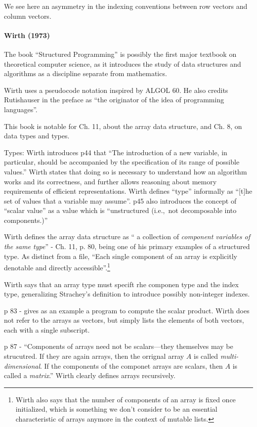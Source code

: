 We see here an asymmetry in the indexing conventions between row vectors and
column vectors.

\paragraph{Wirth (1973)~\cite{Wirth1973}}

The book ``Structured Programming'' is possibly the first major textbook on theoretical computer science, as it introduces the study of data structures and algorithms as a discipline separate from mathematics.

Wirth uses a pseudocode notation inspired by ALGOL 60. He also credits Rutishauser
in the preface as ``the originator of the idea of programming languages''.

This book is notable for Ch. 11, about the array data structure, and Ch. 8, on data types and types.

Types: Wirth introduces p44 that ``The introduction of a new variable, in particular,
should be accompanied by the specification of
its range of possible values.'' Wirth states that doing so is necessary to understand
how an algorithm works and its correctness, and further allows reasoning about memory requirements
of efficient representations.
Wirth defines ``type'' informally as ``[t]he set of values that a variable may
assume''. p45 also introduces the concept of ``scalar value'' as a value
which is ``unstructured (i.e.,\ not decomposable into components.)''


Wirth defines the array data structure as `` a collection of \textit{component
variables of the same type}'' - Ch. 11, p. 80, being one of his primary
examples of a structured type. As distinct from a file, ``Each single component
of an array is explicitly denotable and directly accessible''.\footnote{Wirth
also says that the number of
components of an array is fixed once initialized, which is something we don't
consider to be an essential characteristic of arrays anymore in the context of
mutable lists.}

Wirth says that an array type must specift rhe componen type and the index type,
generalizing Strachey's definition to introduce possibly non-integer indexes.

p 83 - gives as an example a program to compute the scalar product.
Wirth does not refer to the arrays as vectors, but simply lists the elements of
both vectors, each with a single subscript.

p 87 - ``Components of arrays need not be scalars---they themselves may be strucutred.
If they are again arrays, then the orrignal array $A$ is called \textit{multi-dimensional}.
If the components of the componet arrays are scalars, then
$A$ is called a \textit{matrix}.'' Wirth clearly defines arrays recursively.



